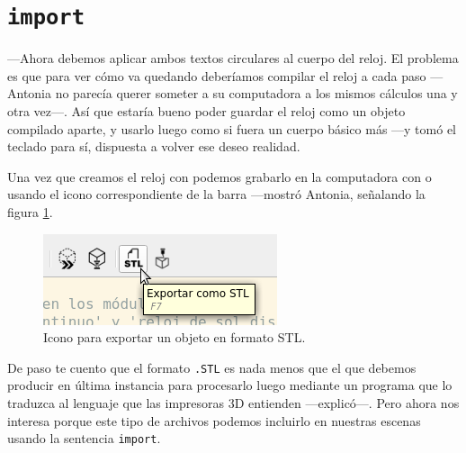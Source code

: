 \section{\texttt{import}}

---Ahora debemos aplicar ambos textos circulares al cuerpo del
reloj. El problema es que para ver cómo va quedando deberíamos
compilar el reloj a cada paso ---Antonia no parecía querer someter a
su computadora a los mismos cálculos una y otra vez---. Así que estaría
bueno poder guardar el reloj como un objeto compilado aparte, y usarlo
luego como si fuera un cuerpo básico más ---y tomó el teclado para
sí, dispuesta a volver ese deseo realidad.

\guillemotright Una vez que creamos el reloj con 
podemos grabarlo en la computadora con  o usando el
icono correspondiente de la barra ---mostró Antonia, señalando la
figura \ref{fig:exportar-stl}.


\begin{figure}[ht]
  \centering
  \includegraphics[width=.55\textwidth]{imagenes/exportar-stl}  
  \caption{Icono para exportar un objeto en formato \textsc{STL}.}
  \label{fig:exportar-stl}
\end{figure}


\guillemotright De paso te cuento que el formato \texttt{.STL} es nada
menos que el que debemos producir en última instancia para procesarlo
luego mediante un programa que lo traduzca al lenguaje que las
impresoras 3D entienden ---explicó---. Pero ahora nos interesa porque
este tipo de archivos podemos incluirlo en nuestras escenas usando la
sentencia \lstinline!import!.

